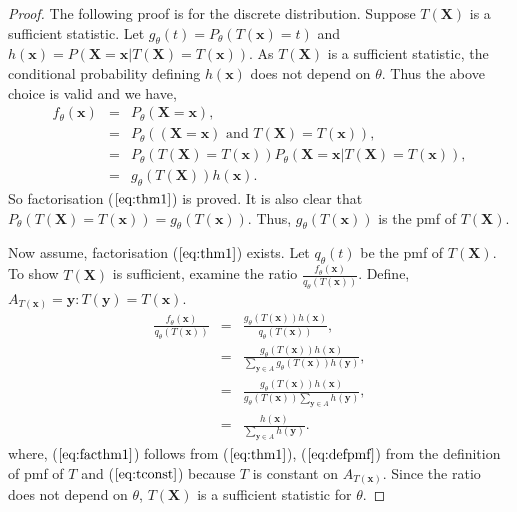 \documentclass[a4paper,english,12pt]{article}
\newcommand{\bx}{\mathbf{x}}
\newcommand{\by}{\mathbf{y}}
\newcommand{\bX}{\mathbf{X}}
\begin{document}
\begin{proof}

The following proof is for the discrete distribution. Suppose $T(\bX)$ is a sufficient statistic. Let $g_\theta(t) = P_\theta (T(\bx)=t)$ and $h(\bx)=P(\bX=\bx|T(\bX)=T(\bx))$. As $T(\bX)$ is a sufficient statistic, the conditional probability defining $h(\bx)$ does not depend on $\theta$. Thus the above choice is valid and we have,
\begin{eqnarray}
f_\theta(\bx) &=& P_\theta(\bX=\bx), \nonumber \\
&=& P_\theta((\bX=\bx) \text { and } T(\bX)=T(\bx)),\nonumber \\
&=& P_\theta(T(\bX)= T(\bx))P_\theta(\bX=\bx | T(\bX)=T(\bx)),\nonumber \\
&=& g_\theta (T(\bX))h(\bx).
\end{eqnarray}
So factorisation ($\ref{eq:thm1}$) is proved. It is also clear that $P_\theta(T(\bX)=T(\bx)) = g_\theta (T(\bx))$. Thus, $g_\theta (T(\bx))$ is the pmf of $T(\bX)$.

Now assume, factorisation ($\ref{eq:thm1}$) exists. Let $q_\theta(t)$ be the pmf of $T(\bX)$. To show $T(\bX)$ is sufficient, examine the ratio $\frac{f_\theta (\bx)}{q_\theta (T(\bx))}$. Define, $ A_{T(\bx)}={\by:T(\by)=T(\bx)}$.
\begin{eqnarray}
\frac{f_\theta (\bx)}{q_\theta (T(\bx))} &=& \frac{g_\theta (T(\bx))h(\bx)}{q_\theta (T(\bx))}, \label{eq:facthm1}\\
&=& \frac{g_\theta (T(\bx))h(\bx)}{\sum_{\by \in A} {g_\theta (T(\bx))h(\by)}}, \label{eq:defpmf}\\
&=& \frac{g_\theta (T(\bx))h(\bx)}{g_\theta (T(\bx)) \sum_{\by \in A} {h(\by)}}, \label{eq:tconst}\\
&=& \frac{h(\bx)}{\sum_{\by \in A} {h(\by)}}. 
\end{eqnarray}
where, ($\ref{eq:facthm1}$) follows from ($\ref{eq:thm1}$), ($\ref{eq:defpmf}$) from the definition of pmf of $T$ and ($\ref{eq:tconst}$) because $T$ is constant on $ A_{T(\bx)}$.
Since the ratio does not depend on $\theta$, $T(\bX)$ is a sufficient statistic for $\theta$.
\end{proof}
\end{document}
